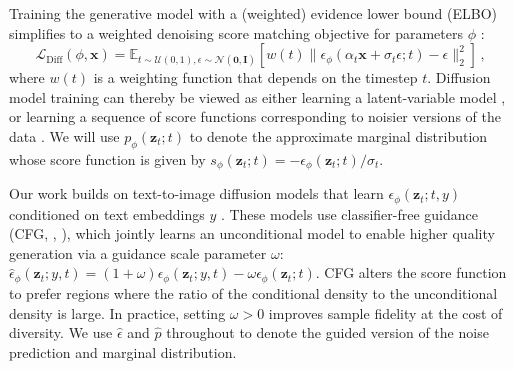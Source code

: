 \documentclass{article} %
\newcommand{\x}[0]{\mathbf{x}}
\newcommand{\z}[0]{\mathbf{z}}
\newcommand{\zt}[0]{{\z}_t}
\newcommand{\ldiff}[0]{\mathcal{L}_{\text{Diff}}}
\begin{document}
Training the generative model with a (weighted) evidence lower bound (ELBO) simplifies to a weighted denoising score matching objective for parameters $\phi$ \citep{ddpm,kingma2021on}:
\begin{equation}
\ldiff(\phi, \x) = \mathbb{E}_{t\sim \mathcal{U}(0,1), \epsilon\sim \mathcal{N}(\mathbf{0}, \mathbf{I})} \left[w(t)\|\epsilon_\phi(\alpha_t \x + \sigma_t \epsilon; t) - \epsilon\|^2_2\right] \, ,
\label{eq:train}
\end{equation}
where $w(t)$ is a weighting function that depends on the timestep $t$.
Diffusion model training can thereby be viewed as either learning a latent-variable model \citep{pmlr-v37-sohl-dickstein15,ddpm}, or learning a sequence of score functions corresponding to noisier versions of the data \citep{vincent2011connection, song2019gradients,scoresde}. %
We will use $p_\phi(\zt; t)$ to denote the approximate marginal distribution whose score function is given by $s_\phi(\zt; t)=-\epsilon_\phi(\zt; t)/\sigma_t$.

Our work builds on text-to-image diffusion models that learn $\epsilon_\phi(\zt; t, y)$ conditioned on text embeddings $y$ \citep{imagen, dalle2, Nichol2022GLIDETP}. These models use classifier-free guidance (CFG, \citeauthor{classifierfree}, \citeyear{classifierfree}), which jointly learns an unconditional model to enable higher quality generation via a guidance scale parameter $\omega$:
$\hat{\epsilon}_\phi(\zt; y, t) = (1+\omega)\epsilon_\phi(\zt; y,t)-\omega \epsilon_\phi(\zt;t)$.
CFG alters the score function %
to prefer regions where the ratio of the conditional density to the unconditional density is large. In practice, setting $\omega > 0$ improves sample fidelity at the cost of diversity. We use $\hat\epsilon$ and $\hat{p}$ throughout to denote the guided version of the noise prediction and marginal distribution.
\end{document}
